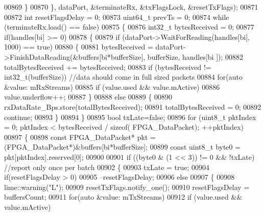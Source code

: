 \begin{DoxyCode}
{{00869         \}
00870     \}, dataPort, &terminateRx, &txFlagsLock, &resetTxFlags);
00871 
00872     \textcolor{keywordtype}{int} resetFlagsDelay = 0;
00873     uint64\_t prevTs = 0;
00874     \textcolor{keywordflow}{while} (terminateRx.load() == \textcolor{keyword}{false})
00875     \{
00876         int32\_t bytesReceived = 0;
00877         \textcolor{keywordflow}{if}(handles[bi] >= 0)
00878         \{
00879             \textcolor{keywordflow}{if} (dataPort->WaitForReading(handles[bi], 1000) == \textcolor{keyword}{true})
00880             \{
00881                 bytesReceived = dataPort->FinishDataReading(&buffers[bi*bufferSize], bufferSize, handles[bi
      ]);
00882                 totalBytesReceived += bytesReceived;
00883                 \textcolor{keywordflow}{if} (bytesReceived != int32\_t(bufferSize)) \textcolor{comment}{//data should come in full sized packets}
00884                     \textcolor{keywordflow}{for}(\textcolor{keyword}{auto} &value: mRxStreams)
00885                         \textcolor{keywordflow}{if} (value.used && value.mActive)
00886                             value.underflow++;
00887             \}
00888             \textcolor{keywordflow}{else}
00889             \{
00890                 rxDataRate_Bps.store(totalBytesReceived);
00891                 totalBytesReceived = 0;
00892                 \textcolor{keywordflow}{continue};
00893             \}
00894         \}
00895         \textcolor{keywordtype}{bool} txLate=\textcolor{keyword}{false};
00896         \textcolor{keywordflow}{for} (uint8\_t pktIndex = 0; pktIndex < bytesReceived / \textcolor{keyword}{sizeof}(
      FPGA_DataPacket); ++pktIndex)
00897         \{
00898             \textcolor{keyword}{const} FPGA_DataPacket* pkt = (FPGA_DataPacket*)&buffers[bi*bufferSize];
00899             \textcolor{keyword}{const} uint8\_t byte0 = pkt[pktIndex].reserved[0];
00900 
00901             \textcolor{keywordflow}{if} ((byte0 & (1 << 3)) != 0 && !txLate) \textcolor{comment}{//report only once per batch}
00902             \{
00903                 txLate = \textcolor{keyword}{true};
00904                 \textcolor{keywordflow}{if}(resetFlagsDelay > 0)
00905                     --resetFlagsDelay;
00906                 \textcolor{keywordflow}{else}
00907                 \{
00908                     lime::warning(\textcolor{stringliteral}{"L"});
00909                     resetTxFlags.notify\_one();
00910                     resetFlagsDelay = buffersCount;
00911                     \textcolor{keywordflow}{for}(\textcolor{keyword}{auto} &value: mTxStreams)
00912                         \textcolor{keywordflow}{if} (value.used && value.mActive)
}}
\end{DoxyCode}
